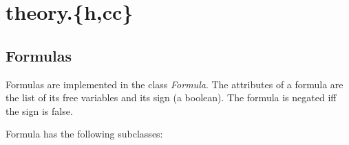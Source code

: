 \documentclass{article}
\begin{document}
\section{theory.\{h,cc\}}

\subsection*{Formulas}

Formulas are implemented in the class \emph{Formula}. The attributes of a formula are the list of its free variables and its sign (a boolean). The formula is negated iff the sign is false.

Formula has the following subclasses:
\end{document}
